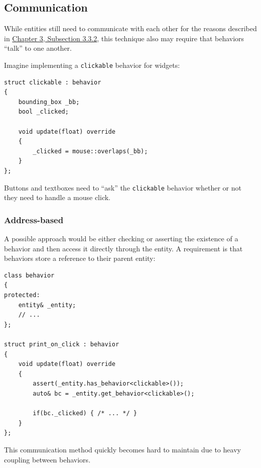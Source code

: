 \documentclass[twoside, 12pt, a4paper, openright]{book}
\begin{document}
\subsection{Communication}\label{communication}

While entities still need to communicate with each other for the reasons
described in \protect\hyperlink{chapter_oop_communication}{Chapter 3,
Subsection 3.3.2}, this technique also may require that behaviors
``talk'' to one another.

Imagine implementing a
\texttt{clickable}
behavior for widgets:

\begin{verbatim}
struct clickable : behavior
{
    bounding_box _bb;
    bool _clicked;

    void update(float) override
    {
        _clicked = mouse::overlaps(_bb);
    }
};
\end{verbatim}

Buttons and textboxes need to ``ask'' the
\texttt{clickable}
behavior whether or not they need to handle a mouse click.

\subsubsection{Address-based}\label{address-based-1}

A possible approach would be either checking or asserting the existence
of a behavior and then access it directly through the entity. A
requirement is that behaviors store a reference to their parent entity:

\begin{verbatim}
class behavior
{
protected:
    entity& _entity;
    // ...
};

struct print_on_click : behavior
{
    void update(float) override
    {
        assert(_entity.has_behavior<clickable>());
        auto& bc = _entity.get_behavior<clickable>();

        if(bc._clicked) { /* ... */ }
    }
};
\end{verbatim}

This communication method quickly becomes hard to maintain due to heavy
coupling between behaviors.
\end{document}
